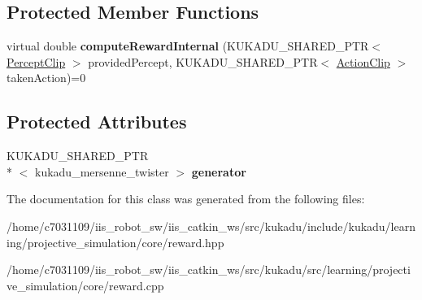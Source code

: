 \subsection*{Protected Member Functions}
\begin{DoxyCompactItemize}
\item 
\hypertarget{classkukadu_1_1Reward_ac7893507bd165f368019bbbdfed9db9a}{virtual double {\bfseries compute\-Reward\-Internal} (K\-U\-K\-A\-D\-U\-\_\-\-S\-H\-A\-R\-E\-D\-\_\-\-P\-T\-R$<$ \hyperlink{classkukadu_1_1PerceptClip}{Percept\-Clip} $>$ provided\-Percept, K\-U\-K\-A\-D\-U\-\_\-\-S\-H\-A\-R\-E\-D\-\_\-\-P\-T\-R$<$ \hyperlink{classkukadu_1_1ActionClip}{Action\-Clip} $>$ taken\-Action)=0}\label{classkukadu_1_1Reward_ac7893507bd165f368019bbbdfed9db9a}

\end{DoxyCompactItemize}
\subsection*{Protected Attributes}
\begin{DoxyCompactItemize}
\item 
\hypertarget{classkukadu_1_1Reward_a028df6b3a9af9353a40c0fe7394d9b50}{K\-U\-K\-A\-D\-U\-\_\-\-S\-H\-A\-R\-E\-D\-\_\-\-P\-T\-R\\*
$<$ kukadu\-\_\-mersenne\-\_\-twister $>$ {\bfseries generator}}\label{classkukadu_1_1Reward_a028df6b3a9af9353a40c0fe7394d9b50}

\end{DoxyCompactItemize}


The documentation for this class was generated from the following files\-:\begin{DoxyCompactItemize}
\item 
/home/c7031109/iis\-\_\-robot\-\_\-sw/iis\-\_\-catkin\-\_\-ws/src/kukadu/include/kukadu/learning/projective\-\_\-simulation/core/reward.\-hpp\item 
/home/c7031109/iis\-\_\-robot\-\_\-sw/iis\-\_\-catkin\-\_\-ws/src/kukadu/src/learning/projective\-\_\-simulation/core/reward.\-cpp\end{DoxyCompactItemize}
